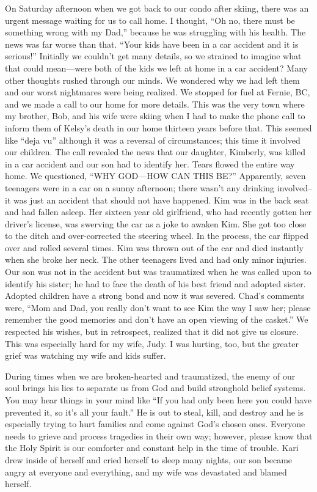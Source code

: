 \documentclass[oneside]{book}
\begin{document}
On Saturday afternoon when we got back to our condo after skiing, there was an urgent message waiting for us to call home. I thought, “Oh no, there must be something wrong with my Dad,” because he was struggling with his health. The news was far worse than that. “Your kids have been in a car accident and it is serious!” Initially we couldn't get many details, so we strained to imagine what that could mean—were both of the kids we left at home in a car accident? Many other thoughts rushed through our minds. We wondered why we had left them and our worst nightmares were being realized. We stopped for fuel at Fernie, BC, and we made a call to our home for more details. This was the very town where my brother, Bob, and his wife were skiing when I had to make the phone call to inform them of Kelsy’s death in our home thirteen years before that. This seemed like “deja vu” although it was a reversal of circumstances; this time it involved our children. The call revealed the news that our daughter, Kimberly, was killed in a car accident and our son had to identify her. Tears flowed the entire way home. We questioned, “WHY GOD—HOW CAN THIS BE?” Apparently, seven teenagers were in a car on a sunny afternoon; there wasn’t any drinking involved--it was just an accident that should not have happened. Kim was in the back seat and had fallen asleep. Her sixteen year old girlfriend, who had recently gotten her driver’s license, was swerving the car as a joke to awaken Kim. She got too close to the ditch and over-corrected the steering wheel. In the process, the car flipped over and rolled several times. Kim was thrown out of the car and died instantly when she broke her neck. The other teenagers lived and had only minor injuries. Our son was not in the accident but was traumatized when he was called upon to identify his sister; he had to face the death of his best friend and adopted sister. Adopted children have a strong bond and now it was severed. Chad's comments were, “Mom and Dad, you really don't want to see Kim the way I saw her; please remember the good memories and don't have an open viewing of the casket.” We respected his wishes, but in retrospect, realized that it did not give us closure. This was especially hard for my wife, Judy.  I was hurting, too, but the greater grief was watching my wife and kids suffer.

During times when we are broken-hearted and traumatized, the enemy of our soul brings his lies to separate us from God and build stronghold belief systems. You may hear things in your mind like “If you had only been here you could have prevented it, so it's all your fault.” He is out to steal, kill, and destroy and he is especially trying to hurt families and come against God's chosen ones. Everyone needs to grieve and process tragedies in their own way; however, please know that the Holy Spirit is our comforter and constant help in the time of trouble. Kari drew inside of herself and cried herself to sleep many nights, our son became angry at everyone and everything, and my wife was devastated and blamed herself.
\end{document}
